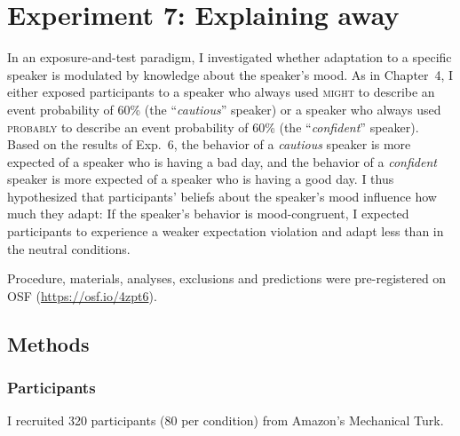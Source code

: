 

\section{Experiment 7: Explaining away}

In an exposure-and-test paradigm, I investigated whether adaptation to a specific speaker is modulated by knowledge about the speaker's mood. As in Chapter~4, I either exposed participants to a speaker who always used \textsc{might} to describe an event probability of 60\% (the ``\textit{cautious}'' speaker) or a speaker who always used \textsc{probably} to describe an event probability of 60\% (the ``\textit{confident}'' speaker). Based on the results of Exp.~6, the behavior of a \textit{cautious} speaker is more expected of a speaker who is having a bad day, and the behavior of a \textit{confident} speaker is more expected of a speaker who is having a good day. I thus hypothesized that participants' beliefs about the speaker's mood influence how much they adapt: If the speaker's behavior is mood-congruent, I expected participants to experience a weaker expectation violation and adapt less than in the neutral conditions.

Procedure, materials, analyses, exclusions and predictions were pre-registered on OSF (\url{https://osf.io/4zpt6}).

\subsection{Methods}

\subsubsection{Participants} I recruited 320 participants (80 per condition) from Amazon's Mechanical Turk. 


